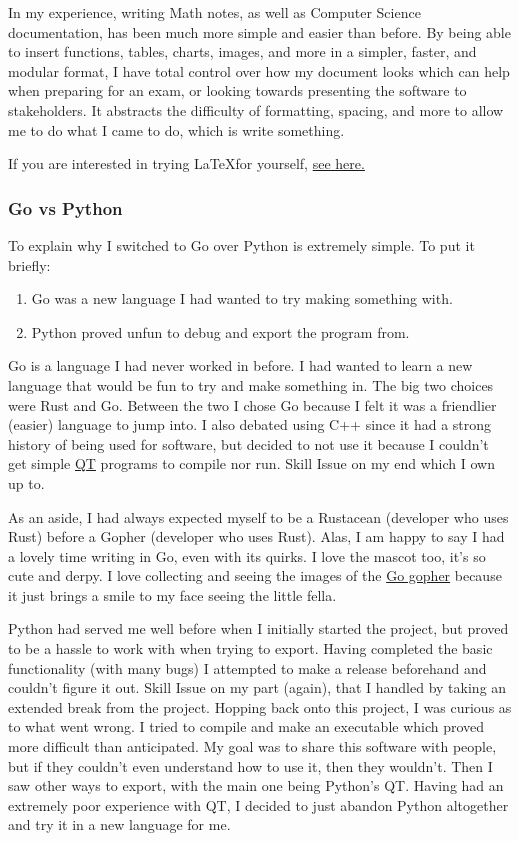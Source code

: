 \documentclass[letterpaper,12pt]{article}
\begin{document}
In my experience, writing Math notes, as well as Computer Science
documentation, has been much more simple and easier than before.
By being able to insert functions, tables, charts, images, and more
in a simpler, faster, and modular format, I have total control over how my
document looks which can help when preparing for an exam, or looking
towards presenting the software to stakeholders. It abstracts the
difficulty of formatting, spacing, and more to allow me to do what I
came to do, which is write something.

If you are interested in trying \LaTeX for yourself,
\href{https://www.latex-project.org/get/}{see here.}

\subsubsection{Go vs Python}

To explain why I switched to Go over Python is extremely simple.
To put it briefly:
\begin{enumerate}
	\item Go was a new language I had wanted to try making something with.
	\item Python proved unfun to debug and export the program from.
\end{enumerate}

Go is a language I had never worked in before. I had wanted to
learn a new language that would be fun to try and make something
in. The big two choices were Rust and Go. Between the two I chose Go because
I felt it was a friendlier (easier) language to jump into. I also
debated using C++ since it had a strong history of being used for
software, but decided to not use it because I couldn't
get simple \href{https://www.qt.io/product/framework}{QT}
programs to compile nor run. Skill Issue on my end which I own up to.

As an aside, I had always expected myself to be a Rustacean
(developer who uses Rust) before a
Gopher (developer who uses Rust). Alas, I am happy to say I had a
lovely time writing in Go,
even with its quirks. I love the mascot too, it's so cute and derpy.
I love collecting and seeing the images of the
\href{https://go.dev/blog/gopher}{Go gopher}
because it just brings a smile to my face seeing the little fella.

Python had served me well before when I initially started the
project, but proved to be a hassle to work with when trying to
export. Having completed the basic functionality (with many bugs) I
attempted to make a release beforehand and couldn't figure it out.
Skill Issue on my part (again), that I handled by taking an extended break
from the project.
Hopping back onto this project, I was curious as to what went
wrong. I tried to compile and make an executable which proved more
difficult than anticipated. My goal was to share this software with
people, but if they couldn't even understand how to use it, then
they wouldn't. Then I saw other ways to export, with the main one
being Python's QT.
Having had an extremely poor experience with QT, I decided to just
abandon Python altogether and try it in a new language for me.
\end{document}
